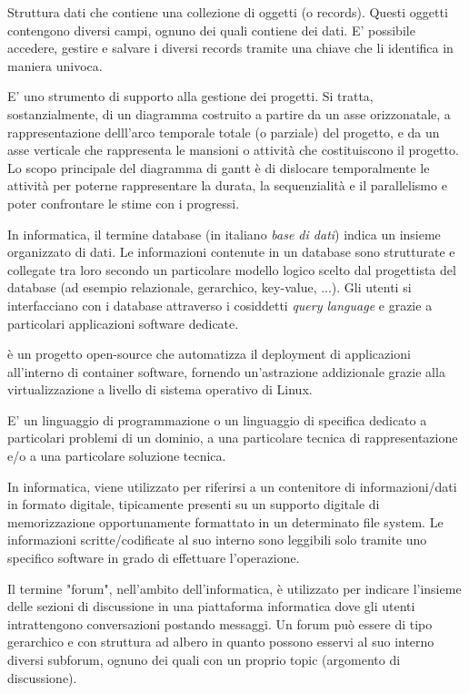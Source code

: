 \documentclass{scalatekids-article}
\begin{document}
 Struttura dati che contiene una collezione di oggetti (o records).
Questi oggetti contengono diversi campi, ognuno dei quali contiene dei dati.
E' possibile accedere, gestire e salvare i diversi records tramite una chiave che li identifica in maniera univoca.

 E' uno strumento di supporto alla gestione dei progetti.
Si tratta, sostanzialmente, di un diagramma costruito a partire da un asse orizzonatale, a rappresentazione delll'arco temporale totale (o parziale) del progetto, e da un asse verticale che rappresenta le mansioni o attività che costituiscono il progetto.
Lo scopo principale del diagramma di gantt è di dislocare temporalmente le attività per poterne rappresentare la durata, la sequenzialità e il parallelismo e poter confrontare le stime con i progressi.

 In informatica, il termine database (in italiano \textit{base di dati}) indica un insieme organizzato di dati.
Le informazioni contenute in un database sono strutturate e collegate tra loro secondo un particolare modello logico scelto dal progettista del database (ad esempio relazionale, gerarchico, key-value, ...).
Gli utenti si interfacciano con i database attraverso i cosiddetti \textit{query language} e grazie a particolari applicazioni software dedicate.

 è un progetto open-source che automatizza il deployment di applicazioni all'interno di container software, fornendo un'astrazione addizionale grazie alla virtualizzazione a livello di sistema operativo di Linux.

 E' un linguaggio di programmazione o un linguaggio di specifica dedicato a particolari problemi di un dominio, a una particolare tecnica di rappresentazione e/o a una particolare soluzione tecnica.



 In informatica, viene utilizzato per riferirsi a un contenitore di informazioni/dati in formato digitale, tipicamente presenti su un supporto digitale di memorizzazione opportunamente formattato in un determinato file system.
Le informazioni scritte/codificate al suo interno sono leggibili solo tramite uno specifico software in grado di effettuare l'operazione.

 Il termine "forum", nell'ambito dell'informatica, è utilizzato per indicare l'insieme delle sezioni di discussione in una piattaforma informatica dove gli utenti intrattengono conversazioni postando messaggi.
Un forum può essere di tipo gerarchico e con struttura ad albero in quanto possono esservi al suo interno diversi subforum, ognuno dei quali con un proprio topic (argomento di discussione).
\end{document}
